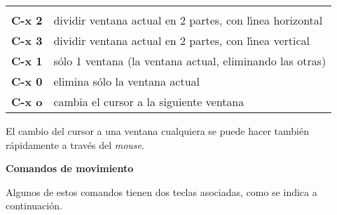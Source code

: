 \vspace{.1cm}

\begin{center}\begin{tabular}{|ll|}
\hline
& \\
{\bf C-x 2} &         dividir ventana actual en 2 partes, con
l\'{\i}nea horizontal\\
{\bf C-x 3} & dividir ventana actual en 2 partes, con l\'{\i}nea
vertical\\
{\bf C-x 1} & s\'olo 1 ventana (la ventana actual, eliminando las
otras) \\
{\bf C-x 0} & elimina s\'olo la ventana actual \\
{\bf C-x o}       &  cambia el cursor a la  siguiente ventana \\[1mm]
\hline
\end{tabular}\end{center}

El cambio del cursor a una ventana cualquiera se puede hacer tambi\'en
r\'apidamente a trav\'es del {\it mouse}.

%



\vspace{.3cm}

\noindent
{\bf Comandos de movimiento}

\vspace{0.1cm}

Algunos de estos comandos tienen dos teclas asociadas, como se indica
a continuaci\'on. 


